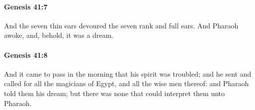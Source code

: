 		\paragraph{Genesis 41:7} %
			\label{GENESIS-41-7}

			And the seven thin ears devoured the seven rank and full ears. And Pharaoh awoke, and, behold, it was a dream.


		\paragraph{Genesis 41:8} %
			\label{GENESIS-41-8}

			And it came to pass in the morning that his spirit was troubled; and he sent and called for all the magicians of Egypt, and all the wise men thereof: and Pharaoh told them his dream; but there was none that could interpret them unto Pharaoh.


